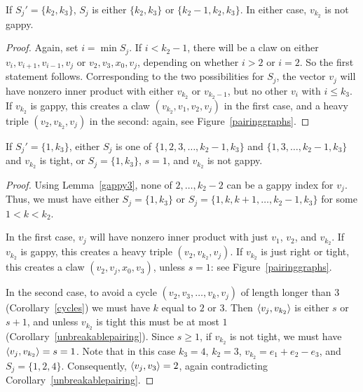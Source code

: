 \begin{lemma}\label{Sjup}
If $S_j' = \{k_2,k_3\}$, $S_j$ is either $\{k_2,k_3\}$ or $\{k_2 - 1, k_2, k_3\}$. In either case, $v_{k_2}$ is not gappy. 
\end{lemma}
\begin{proof}
Again, set $i = \min  S_j$. If $i< k_2-1$, there will be a claw on either $v_i, v_{i+1}, v_{i-1}, v_j$ or $v_2, v_3, x_0, v_j$, depending on whether $i>2$ or $i=2$. So the first statement follows. Corresponding to the two possibilities for $S_j$, the vector $v_j$ will have nonzero inner product with either $v_{k_2}$ or $v_{k_2 - 1}$, but no other $v_i$ with $i \le k_3$. If $v_{k_2}$ is gappy, this creates a claw $(v_{k_2}, v_1, v_2, v_j)$ in the first case, and  a heavy triple $(v_2,v_{k_2},v_j)$ in the second: again, see Figure~\ref{pairinggraphs}.
\end{proof}

\begin{lemma}\label{Sjdown}
If $S_j' = \{1,k_3\}$, either $S_j$ is one of $\{1,2,3,\dots,k_2 - 1, k_3\}$ and $\{1,3,\dots,k_2 - 1, k_3\}$ and $v_{k_2}$ is tight, or $S_j = \{1,k_3\}$, $s = 1$, and $v_{k_2}$ is not gappy.
\end{lemma}
\begin{proof}
Using Lemma~\ref{gappy3}, none of $2,\dots,k_2-2$ can be a gappy index for $v_j$. Thus, we must have either $S_j = \{1,k_3\}$ or
$%
S_j = \{1,k,k+1,\dots,k_2 - 1, k_3\}%
$%
for some $1 < k < k_2$. 

In the first case, $v_j$ will have nonzero inner product with just $v_1$, $v_2$, and $v_{k_2}$. If $v_{k_2}$ is gappy, this creates a heavy triple $(v_2, v_{k_2}, v_j)$. If $v_{k_2}$ is just right or tight, this creates a claw $(v_2, v_j, x_0, v_3)$, unless $s = 1$: see Figure~\ref{pairinggraphs}.

In the second case, to avoid a cycle $(v_2,v_3,\dots,v_k,v_j)$ of length longer than $3$ (Corollary~\ref{cycles}) we must have $k$ equal to $2$ or $3$. Then $\left\langle v_j , v_{k_2} \right\rangle$ is either $s$ or $s+1$, and unless $v_{k_2}$ is tight this must be at most $1$ (Corollary~\ref{unbreakablepairing}). Since $s \ge 1$, if $v_{k_2}$ is not tight, we must have $\left\langle v_j , v_{k_2} \right\rangle = s = 1$. Note that in this case $k_3 = 4$, $k_2=3$, $v_{k_2} = e_1 + e_2 - e_3$, and $S_j = \{ 1,2,4\}$. Consequently, $\left\langle v_j , v_3 \right\rangle = 2$, again contradicting Corollary~\ref{unbreakablepairing}.
\end{proof}

